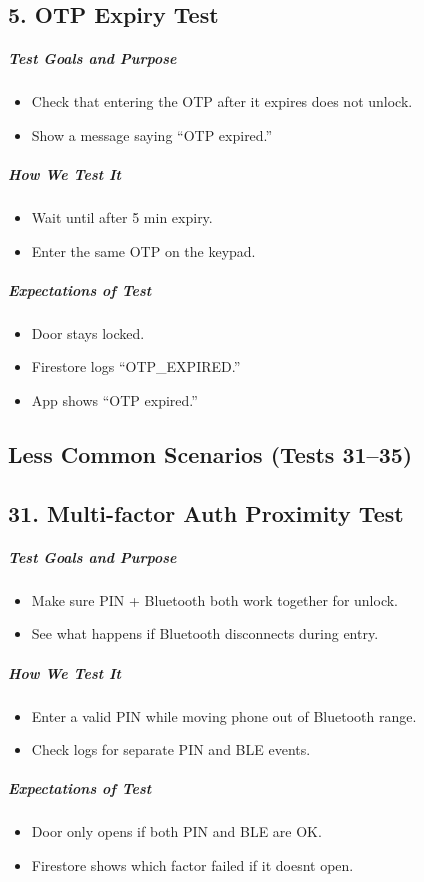 \subsection*{5. OTP Expiry Test}
\subparagraph{Test Goals and Purpose}
\begin{itemize}
    \item Check that entering the OTP after it expires does not unlock.
    \item Show a message saying “OTP expired.”
\end{itemize}
\subparagraph{How We Test It}
\begin{itemize}
    \item Wait until after 5 min expiry.
    \item Enter the same OTP on the keypad.
\end{itemize}
\subparagraph{Expectations of Test}
\begin{itemize}
    \item Door stays locked.
    \item Firestore logs “OTP\_EXPIRED.”
    \item App shows “OTP expired.”
\end{itemize}

\newpage
\subsection*{Less Common Scenarios (Tests 31–35)}

\subsection*{31. Multi-factor Auth Proximity Test}
\subparagraph{Test Goals and Purpose}
\begin{itemize}
    \item Make sure PIN + Bluetooth both work together for unlock.
    \item See what happens if Bluetooth disconnects during entry.
\end{itemize}
\subparagraph{How We Test It}
\begin{itemize}
    \item Enter a valid PIN while moving phone out of Bluetooth range.
    \item Check logs for separate PIN and BLE events.
\end{itemize}
\subparagraph{Expectations of Test}
\begin{itemize}
    \item Door only opens if both PIN and BLE are OK.
    \item Firestore shows which factor failed if it doesnt open.
\end{itemize}

